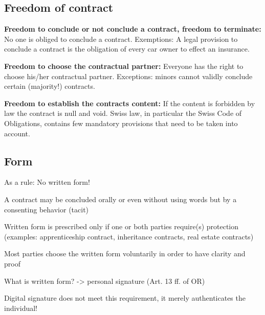 \subsection{Freedom of contract}
\begin{compactitem}
	\item \textbf{Freedom to conclude or not conclude a contract, freedom to terminate:} No one is obliged to conclude a contract. Exemptions: A legal provision to conclude a contract is the obligation of every car owner to effect an insurance.
	\item \textbf{Freedom to choose the contractual partner:} Everyone has the right to choose his/her contractual partner. Exceptions: minors cannot validly conclude certain (majority!) contracts.
	\item \textbf{Freedom to establish the contracts content:} If the content is forbidden by law the contract is null and void. Swiss law, in particular the Swiss Code of Obligations, contains few mandatory provisions that need to be taken into account.
\end{compactitem}

\subsection{Form}
\begin{compactitem}
	\item As a rule: No written form!
	\item A contract may be concluded orally or even without using words but by a consenting behavior (tacit)
	\item Written form is prescribed only if one or both parties require(s) protection (examples: apprenticeship contract, inheritance contracts, real estate contracts)
	\item Most parties choose the written form voluntarily in order to have clarity and	proof
	\item What is written form? -> personal signature (Art. 13 ff. of OR)
	\item Digital signature does not meet this requirement, it merely authenticates the	individual!
\end{compactitem}


